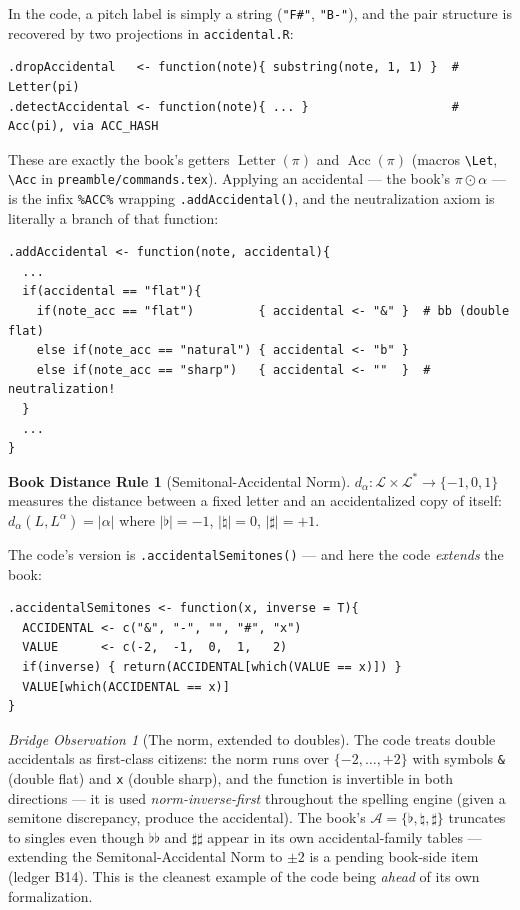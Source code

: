 \documentclass[11pt]{article}
\newcommand{\MAlph}{\mathcal{L}}                 %
\newcommand{\Lstar}{\MAlph^{*}}                  %
\newcommand{\Accset}{\mathcal{A}}               %
\newcommand{\Accf}{\operatorname{Acc}}
\newcommand{\Letterf}{\operatorname{Letter}}
\newcommand{\pit}{\pi}                          %
\theoremstyle{definition}
\newtheorem{bookdist}[bookdef]{Book Distance Rule}
\theoremstyle{remark}
\newtheorem{bridge}{Bridge Observation}[section]
\newcommand{\code}[1]{\texttt{#1}}
\newcommand{\file}[1]{\texttt{#1}}
\begin{document}
In the code, a pitch label is simply a string (\code{"F\#"}, \code{"B-"}), and
the pair structure is recovered by two projections in \file{accidental.R}:

\begin{lstlisting}
.dropAccidental   <- function(note){ substring(note, 1, 1) }  # Letter(pi)
.detectAccidental <- function(note){ ... }                    # Acc(pi), via ACC_HASH
\end{lstlisting}

These are exactly the book's getters $\Letterf(\pit)$ and $\Accf(\pit)$ (macros
\code{\textbackslash Let}, \code{\textbackslash Acc} in
\file{preamble/commands.tex}). Applying an accidental --- the book's
$\pit \odot \alpha$ --- is the infix \code{\%ACC\%} wrapping
\code{.addAccidental()}, and the neutralization axiom is literally a branch of
that function:

\begin{lstlisting}
.addAccidental <- function(note, accidental){
  ...
  if(accidental == "flat"){
    if(note_acc == "flat")         { accidental <- "&" }  # bb (double flat)
    else if(note_acc == "natural") { accidental <- "b" }
    else if(note_acc == "sharp")   { accidental <- ""  }  # neutralization!
  }
  ...
}
\end{lstlisting}

\begin{bookdist}[Semitonal-Accidental Norm]
$d_{\alpha} : \MAlph \times \Lstar \to \{-1, 0, 1\}$ measures the distance between
a fixed letter and an accidentalized copy of itself:
$d_{\alpha}(L, L^{\alpha}) = |\alpha|$ where
$|\flat| = -1$, $|\natural| = 0$, $|\sharp| = +1$.
\end{bookdist}

The code's version is \code{.accidentalSemitones()} --- and here the code
\emph{extends} the book:

\begin{lstlisting}
.accidentalSemitones <- function(x, inverse = T){
  ACCIDENTAL <- c("&", "-", "", "#", "x")
  VALUE      <- c(-2,  -1,  0,  1,   2)
  if(inverse) { return(ACCIDENTAL[which(VALUE == x)]) }
  VALUE[which(ACCIDENTAL == x)]
}
\end{lstlisting}

\begin{bridge}[The norm, extended to doubles]\label{obs:doubles}
The code treats double accidentals as first-class citizens: the norm runs over
$\{-2, \dots, +2\}$ with symbols \code{\&} (double flat) and \code{x}
(double sharp), and the function is invertible in both directions --- it is used
\emph{norm-inverse-first} throughout the spelling engine (given a semitone
discrepancy, produce the accidental). The book's
$\Accset = \{\flat, \natural, \sharp\}$ truncates to singles even though
$\flat\flat$ and $\sharp\sharp$ appear in its own accidental-family tables ---
extending the Semitonal-Accidental Norm to $\pm 2$ is a pending book-side item
(ledger B14). This is the cleanest example of the code being \emph{ahead} of its
own formalization.
\end{bridge}
\end{document}
